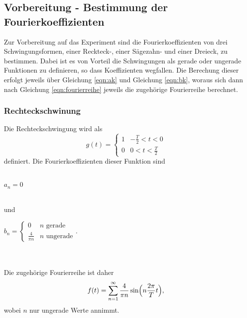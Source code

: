 \subsection{Vorbereitung - Bestimmung der Fourierkoeffizienten}
\label{sec:vorbereitung}
Zur Vorbereitung auf das Experiment sind die Fourierkoeffizienten von drei Schwingungsformen, einer Reckteck-, einer Sägezahn-
und einer Dreieck, zu bestimmen. Dabei ist es von Vorteil die Schwingungen als gerade oder ungerade Funktionen zu definieren, so 
dass Koeffizienten wegfallen. Die Berechung dieser erfolgt jeweils über Gleichung \eqref{eqn:ak} und Gleichung \eqref{eqn:bk},
woraus sich dann nach Gleichung \eqref{eqn:fourierreihe} jeweils die zugehörige Fourierreihe berechnet.
    \subsubsection{Rechteckschwinung}
    Die Rechteckschwingung wird als
    \begin{equation}
    \label{eqn:rechteck}
    g(t) = \begin{cases}
                1 & -\frac{T}{2} < t < 0 \\
                0 & 0 < t < \frac{T}{2} 
            \end{cases}
    \end{equation}        
    definiert. Die Fourierkoeffizienten dieser Funktion sind
    \\ \\
    \centerline{$a_n = 0$} 
    \\ 
    und
    \\ 
    \centerline{$b_n = \begin{cases}
                            0 & n \text{ gerade} \\
                            \frac{4}{\pi n } & n \text{ ungerade}
                        \end{cases}$.}
                        \\ \\
    Die zugehörige Fourierreihe ist daher
    \begin{equation}
    \label{eqn:fourierrechteck}
    f(t) = \sum_{n=1}^{\infty}  \frac{4}{\pi n } \sin \Bigl(n \frac{2 \pi}{T} t \Bigr),
    \end{equation}
    wobei $n$ nur ungerade Werte annimmt.

